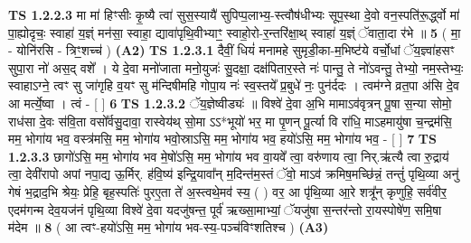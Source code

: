 \documentclass[17pt]{extarticle}
\begin{document}
                  \newline
                                \textbf{ TS 1.2.2.3} \newline
                  मा मा॑ हिꣳसीः कृ॒ष्यै त्वा॑ सुस॒स्यायै॑ सुपिप्प॒लाभ्य॒-स्त्वौष॑धीभ्यः सूप॒स्था दे॒वो वन॒स्पति॑रू॒र्द्ध्वो मा॑ पा॒ह्योदृचः॒ स्वाहा॑ य॒ज्ञ्ं मन॑सा॒ स्वाहा॒ द्यावा॑पृथि॒वीभ्याꣳ॒॒ स्वाहो॒रो-र॒न्तरि॑क्षा॒थ् स्वाहा॑ य॒ज्ञ्ं ॅवाता॒दा र॑भे ॥ \textbf{  5 } \newline
                  \newline
                      ( मा॒ - योनि॑रसि - त्रिꣳ॒॒शच्च॑ )  \textbf{(A2)} \newline \newline
                                        \textbf{ TS 1.2.3.1} \newline
                  दैवीं॒ धियं॑ मनामहे सुमृडी॒का-म॒भिष्ट॑ये वर्चो॒धां ॅय॒ज्ञ्वा॑हसꣳ सुपा॒रा नो॑ अस॒द् वशे᳚ । ये दे॒वा मनो॑जाता मनो॒युजः॑ सु॒दक्षा॒ दक्ष॑पितार॒स्ते नः॑ पान्तु॒ ते नो॑ऽवन्तु॒ तेभ्यो॒ नम॒स्तेभ्यः॒ स्वाहाऽग्ने॒ त्वꣳ सु जा॑गृहि व॒यꣳ सु म॑न्दिषीमहि गोपा॒य नः॑ स्व॒स्तये᳚ प्र॒बुधे॑ नः॒ पुन॑र्ददः । त्वम॑ग्ने व्रत॒पा अ॑सि दे॒व आ मर्त्ये॒ष्वा । त्वं - [ ] \textbf{  6} \newline
                  \newline
                                \textbf{ TS 1.2.3.2} \newline
                  ॅय॒ज्ञेष्वीड्यः॑ ॥ विश्वे॑ दे॒वा अ॒भि मामाऽव॑वृत्रन् पू॒षा स॒न्या सोमो॒ राध॑सा दे॒वः स॑वि॒ता वसो᳚र्वसु॒दावा॒ रास्वेय॑थ् सो॒मा ऽऽ*भूयो॑ भर॒ मा पृ॒णन् पू॒र्त्या वि रा॑धि॒ माऽहमायु॑षा च॒न्द्रम॑सि॒ मम॒ भोगा॑य भव॒ वस्त्र॑मसि॒ मम॒ भोगा॑य भवो॒स्राऽसि॒ मम॒ भोगा॑य भव॒ हयो॑ऽसि॒ मम॒ भोगा॑य भव॒ - [ ] \textbf{  7} \newline
                  \newline
                                \textbf{ TS 1.2.3.3} \newline
                  छागो॑ऽसि॒ मम॒ भोगा॑य भव मे॒षो॑ऽसि॒ मम॒ भोगा॑य भव वा॒यवे᳚ त्वा॒ वरु॑णाय त्वा॒ निर्.ऋ॑त्यै त्वा रु॒द्राय॑ त्वा॒ देवी॑रापो अपां नपा॒द्य ऊ॒र्मिर्. ह॑वि॒ष्य॑ इन्द्रि॒यावा᳚न् म॒दिन्त॑म॒स्तं ॅवो॒ माऽव॑ क्रमिष॒मच्छि॑न्नं॒ तन्तुं॑ पृथि॒व्या अनु॑ गेषं भ॒द्राद॒भि श्रेयः॒ प्रेहि॒ बृह॒स्पतिः॑ पुरए॒ता ते॑ अ॒स्त्वथे॒मव॑ स्य॒ ( ) वर॒ आ पृ॑थि॒व्या आ॒रे शत्रू᳚न् कृणुहि॒ सर्व॑वीर॒ एदम॑गन्म देव॒यज॑नं पृथि॒व्या विश्वे॑ दे॒वा यदजु॑षन्त॒ पूर्व॑ ऋख्सा॒माभ्यां॒ ॅयजु॑षा स॒न्तर॑न्तो रा॒यस्पोषे॑ण॒ समि॒षा म॑देम ॥ \textbf{  8} \newline
                  \newline
                      ( आ त्वꣳ-हयो॑ऽसि॒ मम॒ भोगा॑य भव-स्य॒-पञ्च॑विꣳशतिश्च )  \textbf{(A3)} \newline \newline
\end{document}
